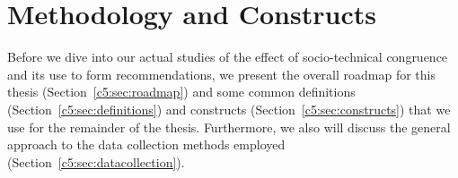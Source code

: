 \section{Methodology and Constructs}
\label{chap:meth}
Before we dive into our actual studies of the effect of socio-technical congruence and its use to form recommendations, we present the overall roadmap for this thesis (Section~\ref{c5:sec:roadmap}) and some common definitions (Section~\ref{c5:sec:definitions}) and constructs (Section~\ref{c5:sec:constructs}) that we use for the remainder of the thesis.
Furthermore, we also will discuss the general approach to the data collection methods employed (Section~\ref{c5:sec:datacollection}).


